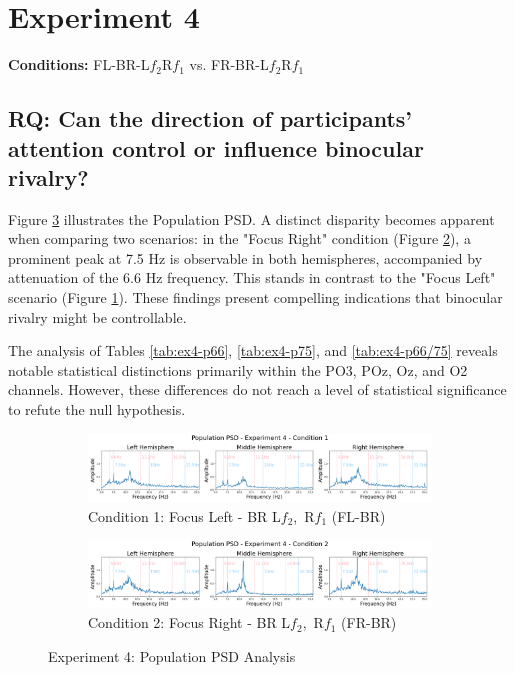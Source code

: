 \clearpage
\section{Experiment 4}
\textbf{Conditions:} FL-BR-L$f_{2}$R$f_{1}$ vs.  FR-BR-L$f_{2}$R$f_{1}$ \\


\subsection{RQ: Can the direction of participants' attention control or influence binocular rivalry?}

Figure \ref{fig:e4_population} illustrates the Population PSD. A distinct disparity becomes apparent when comparing two scenarios: in the "Focus Right" condition (Figure \ref{fig:e131}), a prominent peak at 7.5 Hz is observable in both hemispheres, accompanied by attenuation of the 6.6 Hz frequency. This stands in contrast to the "Focus Left" scenario (Figure \ref{fig:e130}). These findings present compelling indications that binocular rivalry might be controllable.

The analysis of Tables \ref{tab:ex4-p66}, \ref{tab:ex4-p75}, and \ref{tab:ex4-p66/75} reveals notable statistical distinctions primarily within the PO3, POz, Oz, and O2 channels. However, these differences do not reach a level of statistical significance to refute the null hypothesis.

\begin{figure}[b]
    \centering
    
    \begin{subfigure}{1.0\textwidth}
        \includegraphics[width=\linewidth]{images/results/e130.png}
        \caption{Condition 1: Focus Left - BR L$f_{2}$,~R$f_{1}$ (FL-BR)}
        \label{fig:e130}
    \end{subfigure}
    
    \begin{subfigure}{1.0\textwidth}
        \includegraphics[width=\linewidth]{images/results/e131.png}
        \caption{Condition 2: Focus Right - BR L$f_{2}$,~R$f_{1}$ (FR-BR)}
        \label{fig:e131}
    \end{subfigure}
    
    \caption{Experiment 4: Population PSD Analysis}
    \label{fig:e4_population}
\end{figure}




